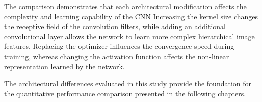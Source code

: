 The comparison demonstrates that each architectural modification affects the complexity and learning capability of the CNN Increasing the kernel size changes the receptive field of the convolution filters, while adding an additional convolutional layer allows the network to learn more complex hierarchical image features. Replacing the optimizer influences the convergence speed during training, whereas changing the activation function affects the non-linear representation learned by the network.

The architectural differences evaluated in this study provide the foundation for the quantitative performance comparison presented in the following chapters.